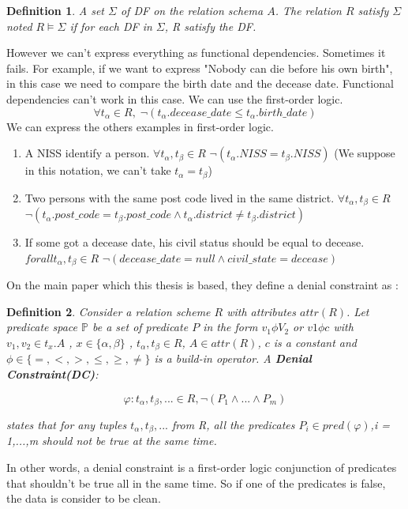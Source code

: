 \documentclass[letterpaper, 12pt]{report}
\newtheorem{mydef}{Definition}
\begin{document}
\begin{mydef}
A set $\Sigma$ of DF on the relation schema $A$. The relation $R$ satisfy $\Sigma$ noted $R \models \Sigma$ if for each DF in $\Sigma$, R satisfy the DF.
\end{mydef}

However we can't express everything as functional dependencies. Sometimes it fails. For example, if we want to express "Nobody can die before his own birth", in this case we need to compare the birth date and the decease date. Functional dependencies can't work in this case. We can use the first-order logic. 
$$\forall t_\alpha \in R, \; \neg(t_\alpha.decease\_date \leq t_\alpha.birth\_date)$$ We can express the others examples in first-order logic.

\begin{enumerate}
\item A NISS identify a person. $\forall t_\alpha,t_\beta \in R$ $\neg(t_\alpha.NISS = t_\beta.NISS)$ (We suppose in this notation, we can't take $t_\alpha = t_\beta$)
\item Two persons with the same post code lived in the same district. $\forall t_\alpha,t_\beta \in R$ $\neg(t_\alpha.post\_code = t_\beta.post\_code \wedge t_\alpha.district \neq t_\beta.district) $
\item If some got a decease date, his civil status should be equal to decease. $forall t_\alpha,t_\beta \in R$ $\neg(decease\_date = null \wedge civil\_state = decease)$
\end{enumerate}

On the main paper which this thesis is based, they define a denial constraint as \cite{main}:

\begin{mydef}
Consider a relation scheme $R$ with attributes $attr(R)$. Let predicate space $\mathbb{P}$ be a set of predicate  $P$ in the form  $v_1 \phi V_2$ or $v1 \phi c$ with $v_1,v_2 \in t_x.A$ , $x \in \{\alpha,\beta\}$ , $t_\alpha,t_\beta \in R$, $A \in attr(R)$, $c$ is a constant and $\phi \in \{ =,<,>,\leq, \geq, \neq \}$ is a build-in operator.  A \textbf{Denial Constraint(DC)}:

$$\varphi : t_\alpha,t_\beta,... \in R, \neg(P_1 \wedge ... \wedge P_m)$$

states that for any tuples $t_\alpha,t_\beta,...$ from R, all the predicates $P_i \in pred(\varphi)$,i = 1,...,m should not be true at the same time.
\end{mydef}

In other words, a denial constraint is a first-order logic conjunction of predicates that shouldn't be true all in the same time. So if one of the predicates is false, the data is consider to be clean. 
\end{document}

